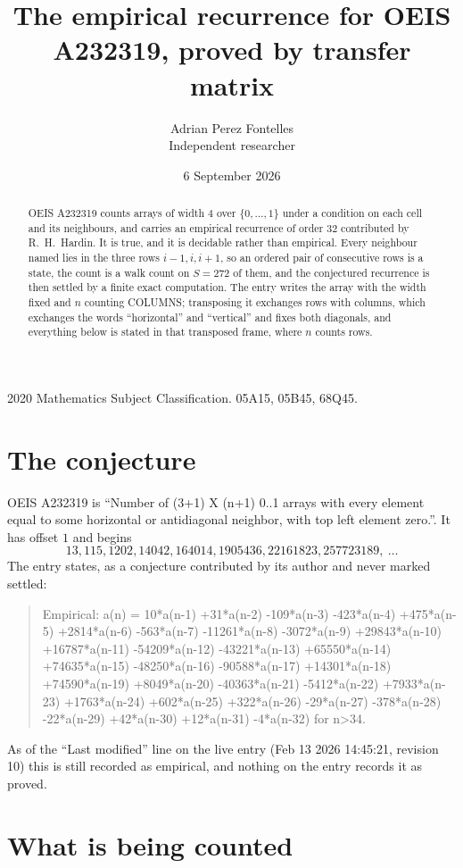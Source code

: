 \documentclass[11pt,a4paper]{article}
\title{The empirical recurrence for OEIS A232319, proved by transfer matrix}
\author{Adrian Perez Fontelles\\ \small Independent researcher}
\date{6 September 2026}
\theoremstyle{plain}
\theoremstyle{definition}
\begin{document}
\maketitle

\begin{abstract}
OEIS A232319 counts arrays of width $4$ over $\{0,\dots,1\}$ under a condition on each cell
and its neighbours, and carries an empirical recurrence of order $32$ contributed by
R.~H.~Hardin. It is true, and it is decidable rather than empirical. Every neighbour named lies
in the three rows $i-1,i,i+1$, so an ordered pair of consecutive rows is a state, the count is
a walk count on $S=272$ of them, and the conjectured recurrence is then settled by a finite
exact computation. The entry writes the array with the width fixed and $n$ counting
COLUMNS; transposing it exchanges rows with columns, which exchanges the words ``horizontal''
and ``vertical'' and fixes both diagonals, and everything below is stated in that transposed
frame, where $n$ counts rows.
\end{abstract}

\noindent\small 2020 Mathematics Subject Classification. 05A15, 05B45, 68Q45.\normalsize

\section{The conjecture}

OEIS A232319 is ``Number of (3+1) X (n+1) 0..1 arrays with every element equal to some horizontal or antidiagonal neighbor, with top left element zero.''. It has offset $1$ and begins
\[
13, 115, 1202, 14042, 164014, 1905436, 22161823, 257723189,\ \dots
\]
The entry states, as a conjecture contributed by its author and never marked settled:
\begin{quote}
Empirical: a(n) = 10*a(n-1) +31*a(n-2) -109*a(n-3) -423*a(n-4) +475*a(n-5) +2814*a(n-6) -563*a(n-7) -11261*a(n-8) -3072*a(n-9) +29843*a(n-10) +16787*a(n-11) -54209*a(n-12) -43221*a(n-13) +65550*a(n-14) +74635*a(n-15) -48250*a(n-16) -90588*a(n-17) +14301*a(n-18) +74590*a(n-19) +8049*a(n-20) -40363*a(n-21) -5412*a(n-22) +7933*a(n-23) +1763*a(n-24) +602*a(n-25) +322*a(n-26) -29*a(n-27) -378*a(n-28) -22*a(n-29) +42*a(n-30) +12*a(n-31) -4*a(n-32) for n>34.
\end{quote}
As of the ``Last modified'' line on the live entry (Feb 13 2026 14:45:21, revision 10) this is still
recorded as empirical, and nothing on the entry records it as proved.

\section{What is being counted}
\end{document}
